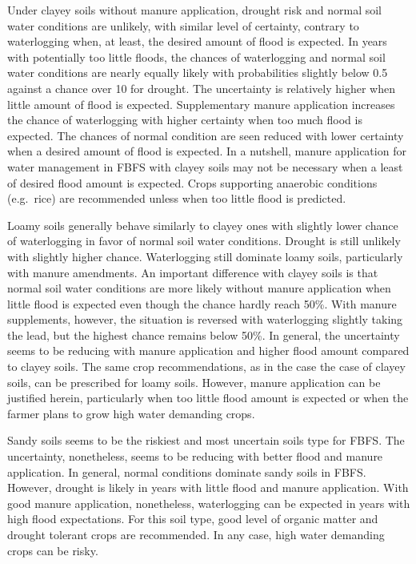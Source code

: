 \documentclass[12pt,oneside]{article}
\begin{document}
Under clayey soils without manure application, drought risk and normal soil water conditions are unlikely, with similar level of certainty, contrary to waterlogging when, at least, the desired amount of flood is expected. In years with potentially too little floods, the chances of waterlogging and normal soil water conditions are nearly equally likely with probabilities slightly below 0.5 against a chance over 10 for drought. The uncertainty is relatively higher when little amount of flood is expected. Supplementary manure application increases the chance of waterlogging with higher certainty when too much flood is expected. The chances of normal condition are seen reduced with lower certainty when a desired amount of flood is expected. In a nutshell, manure application for water management in FBFS with clayey soils may not be necessary when a least of desired flood amount is expected. Crops supporting anaerobic conditions (e.g.~rice) are recommended unless when too little flood is predicted.

Loamy soils generally behave similarly to clayey ones with slightly lower chance of waterlogging in favor of normal soil water conditions. Drought is still unlikely with slightly higher chance. Waterlogging still dominate loamy soils, particularly with manure amendments. An important difference with clayey soils is that normal soil water conditions are more likely without manure application when little flood is expected even though the chance hardly reach 50\%. With manure supplements, however, the situation is reversed with waterlogging slightly taking the lead, but the highest chance remains below 50\%. In general, the uncertainty seems to be reducing with manure application and higher flood amount compared to clayey soils. The same crop recommendations, as in the case the case of clayey soils, can be prescribed for loamy soils. However, manure application can be justified herein, particularly when too little flood amount is expected or when the farmer plans to grow high water demanding crops.

Sandy soils seems to be the riskiest and most uncertain soils type for FBFS. The uncertainty, nonetheless, seems to be reducing with better flood and manure application. In general, normal conditions dominate sandy soils in FBFS. However, drought is likely in years with little flood and manure application. With good manure application, nonetheless, waterlogging can be expected in years with high flood expectations. For this soil type, good level of organic matter and drought tolerant crops are recommended. In any case, high water demanding crops can be risky.
\end{document}
